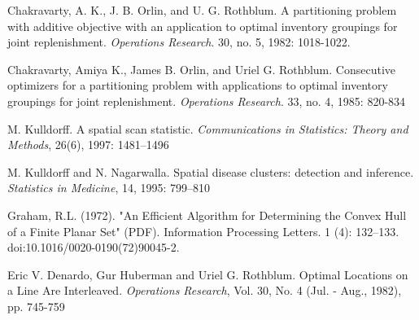 \documentclass{article}
\theoremstyle{case}
\begin{document}
\begin{thebibliography}{1}

    Chakravarty, A. K., J. B. Orlin, and U. G. Rothblum. A partitioning problem with additive objective with an application to optimal inventory groupings for joint replenishment. {\em Operations Research}. 30, no. 5, 1982: 1018-1022.

     Chakravarty, Amiya K., James B. Orlin, and Uriel G. Rothblum. Consecutive optimizers for a partitioning problem with applications to optimal inventory groupings for joint replenishment. {\em Operations Research}. 33, no. 4, 1985: 820-834

	 M. Kulldorff. A spatial scan statistic. {\em Communications in Statistics: Theory and Methods}, 26(6), 1997: 1481–1496

	 M. Kulldorff and N. Nagarwalla. Spatial disease clusters: detection and inference. {\em Statistics in Medicine}, 14, 1995: 799–810
	
	 Graham, R.L. (1972). "An Efficient Algorithm for Determining the Convex Hull of a Finite Planar Set" (PDF). Information Processing Letters. 1 (4): 132–133. doi:10.1016/0020-0190(72)90045-2.	
	
	 Eric V. Denardo, Gur Huberman and Uriel G. Rothblum. Optimal Locations on a Line Are Interleaved. {\em Operations Research}, Vol. 30, No. 4 (Jul. - Aug., 1982), pp. 745-759

\end{thebibliography}
\end{document}
